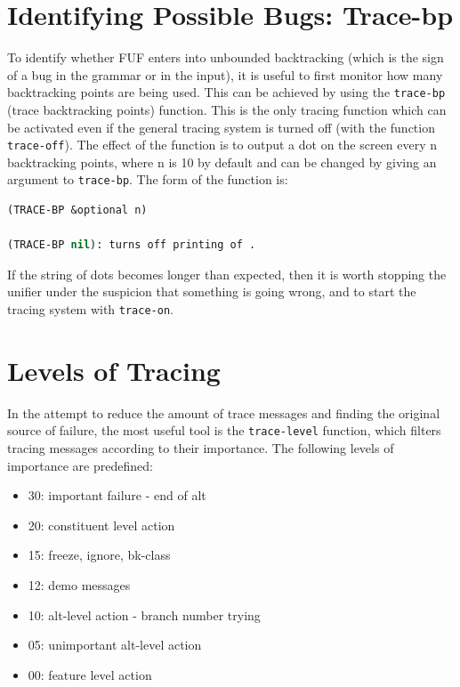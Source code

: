 \documentclass[10pt,a4paper]{report}
\begin{document}
\section{Identifying Possible Bugs: Trace-bp}

To identify whether FUF enters into unbounded backtracking (which is the
sign of a bug in the grammar or in the input), it is useful to first
monitor how many backtracking points are being used.  This can be achieved
by using the {\tt trace-bp} (trace backtracking points) function.  This is
the only tracing function which can be activated even if the general
tracing system is turned off (with the function {\tt trace-off}).  The effect
of the function is to output a dot on the screen every n backtracking
points, where n is 10 by default and can be changed by giving an argument
to {\tt trace-bp}.  The form of the function is:

\begin{lstlisting}[language=Lisp]
(TRACE-BP &optional n)

(TRACE-BP nil): turns off printing of .
\end{lstlisting}

If the string of dots becomes longer than expected, then it is worth
stopping the unifier under the suspicion that something is going wrong, and
to start the tracing system with {\tt trace-on}.

\section{Levels of Tracing}

In the attempt to reduce the amount of trace messages and finding the
original source of failure, the most useful tool is the {\tt trace-level}
function, which filters tracing messages according to their importance.
The following levels of importance are predefined:
\begin{itemize}
\item 30: important failure - end of alt

\item 20: constituent level action

\item 15: freeze, ignore, bk-class

\item 12: demo messages

\item 10: alt-level action - branch number trying

\item 05: unimportant alt-level action

\item 00: feature level action
\end{itemize}
\end{document}
